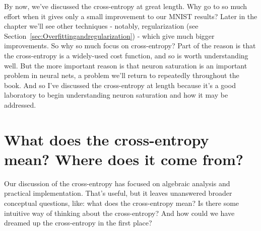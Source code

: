 By now, we've discussed the cross-entropy at great length. Why go to so much effort when it gives only a small improvement to our MNIST results? Later in the chapter we'll see other techniques - notably, regularization (see Section~\ref{sec:Overfittingandregularization}) - which give much bigger improvements. So why so much focus on cross-entropy? Part of the reason is that the cross-entropy is a widely-used cost function, and so is worth understanding well. But the more important reason is that neuron saturation is an important problem in neural nets, a problem we'll return to repeatedly throughout the book. And so I've discussed the cross-entropy at length because it's a good laboratory to begin understanding neuron saturation and how it may be addressed.



\section{What does the cross-entropy mean? Where does it come from?}
\label{sec:Whatdoesthecross-entropymeanWheredoesitcomefrom?}

Our discussion of the cross-entropy has focused on algebraic analysis and practical implementation. That's useful, but it leaves unanswered broader conceptual questions, like: what does the cross-entropy mean? Is there some intuitive way of thinking about the cross-entropy? And how could we have dreamed up the cross-entropy in the first place?

